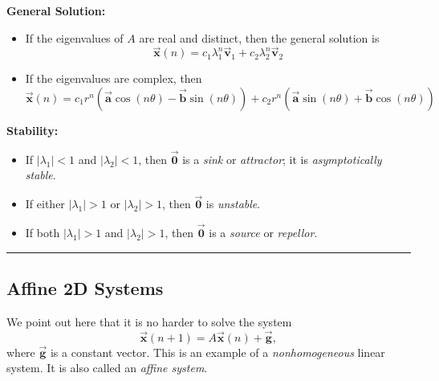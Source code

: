 \documentclass[reqno]{immbook}
\newcommand{\BA}{\vec{\textbf{a}}}
\newcommand{\BB}{\vec{\textbf{b}}}
\newcommand{\BG}{\vec{\textbf{g}}}
\newcommand{\BV}{\vec{\textbf{v}}}
\newcommand{\BX}{\vec{\textbf{x}}}
\newcommand{\BZero}{\vec{\textbf{0}}}  %
\numberwithin{equation}{chapter}
\numberwithin{question}{section}
\numberwithin{theorem}{chapter}
\numberwithin{figure}{chapter}
\theoremstyle{definition}
\begin{document}
\medskip
\noindent
\textbf{General Solution:}
\begin{itemize}
\item If the eigenvalues of $A$ are real and distinct, then the
general solution is
\begin{equation}
   \BX(n) = c_1 \lambda_1^n \BV_1 + c_2 \lambda_2^n \BV_2
\end{equation}
\item If the eigenvalues are complex, then
\begin{equation}
  \BX(n) =    c_1 r^n(\BA\cos(n\theta)-\BB\sin(n\theta))
           + c_2 r^n(\BA\sin(n\theta)+\BB\cos(n\theta))
\label{eqn:linear2dcomplexgensol}
\end{equation}
\end{itemize}

\noindent
\textbf{Stability:}
\begin{itemize}
\item If $|\lambda_1| < 1$ and $|\lambda_2| < 1$, then
$\BZero$ is a \emph{sink} or \emph{attractor}; it is
\emph{asymptotically stable}.
\item If either $|\lambda_1| > 1$ or $|\lambda_2|>1$, then
$\BZero$ is \emph{unstable}.
\item If both $|\lambda_1| > 1$ and $|\lambda_2|>1$, then
$\BZero$ is a \emph{source} or \emph{repellor}.
\end{itemize}

\medskip

\hrule

\medskip
\subsection*{Affine 2D Systems}
We point out here that it is no harder to solve the
system
\begin{equation}
  \BX(n+1) = A\BX(n) + \BG,
  \label{eqn:affine}
\end{equation}
where $\BG$ is a constant vector.
This is an example of a \emph{nonhomogeneous}
linear system.  It is also called an \emph{affine system}.
\end{document}
